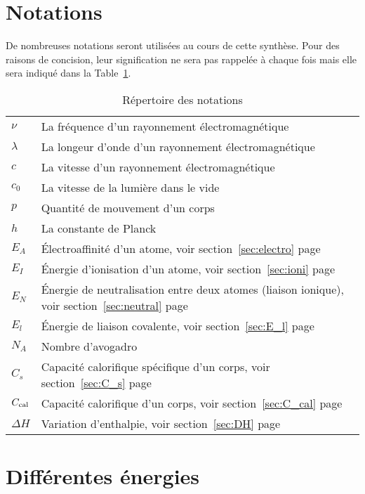 \section{Notations}
\label{ann:nota}
De nombreuses notations seront utilisées au cours de cette synthèse.
Pour des raisons de concision, leur signification ne sera pas rappelée à chaque fois mais elle sera indiqué dans la Table~\ref{tab:notations}.
\begin{table}[h!]
	\begin{center}
		\begin{tabular}{ll}
			$\nu$ & La fréquence d'un rayonnement électromagnétique\\
			$\lambda$ & La longeur d'onde d'un rayonnement électromagnétique\\
			$c$ & La vitesse d'un rayonnement électromagnétique\\
			$c_0$ & La vitesse de la lumière dans le vide\\
			$p$ & Quantité de mouvement d'un corps\\
			$h$ & La constante de Planck\\
			$E_A$ & \'Electroaffinité d'un atome,
			voir section~\ref{sec:electro} page~\pageref{sec:electro}\\
			$E_I$ & \'Energie d'ionisation d'un atome,
			voir section~\ref{sec:ioni} page~\pageref{sec:ioni}\\
			$E_N$ & \'Energie de neutralisation entre deux atomes (liaison ionique),
			voir section~\ref{sec:neutral} page~\pageref{sec:neutral}\\
			$E_l$ & \'Energie de liaison covalente,
			voir section~\ref{sec:E_l} page~\pageref{sec:E_l}\\ %
			$N_A$ & Nombre d'avogadro\\
			$C_s$ & Capacité calorifique spécifique d'un corps, voir section~\ref{sec:C_s} page~\pageref{sec:C_s}\\
			$C_\mathrm{cal}$ & Capacité calorifique d'un corps, voir section~\ref{sec:C_cal} page~\pageref{sec:C_cal}\\
			$\Delta H$ & Variation d'enthalpie, voir section~\ref{sec:DH} page~\pageref{sec:DH}
		\end{tabular}
		\caption{Répertoire des notations}
		\label{tab:notations}
	\end{center}
\end{table}

\section{Différentes énergies}

